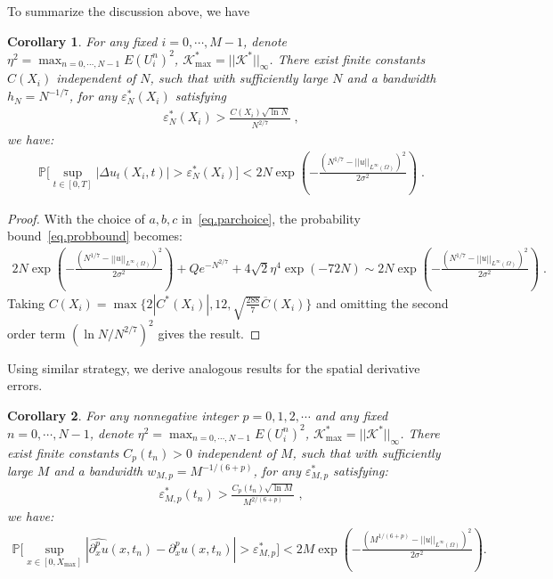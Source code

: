 \documentclass[a4paper,11pt]{article}
\newtheorem{corollary}{Corollary}[section]
\theoremstyle{definition}
\begin{document}
To summarize the discussion above, we have
\begin{corollary}
For any fixed $i=0,\cdots,M-1$, denote $\eta^2 = \max_{n=0,\cdots,N-1}E(U_i^n)^2$, $\mathcal{K}^*_{\max}=||\mathcal{K}^*||_\infty$. There exist finite constants $C(X_i)$ independent of $N$, such that with sufficiently large $N$ and a bandwidth $h_N = N^{-1/7}$, for any $\varepsilon_N^*(X_i)$ satisfying
\begin{align*}
\varepsilon_N^*(X_i)> \frac{C(X_i)\sqrt{\ln N}}{N^{2/7}}\;,
\end{align*}
we have:
\begin{align}
\mathbb{P}\Big[\sup_{t\in[0,T]}|\Delta u_t(X_i,t)|>\varepsilon_N^*(X_i)\Big]<2N \exp(-\frac{(N^{1/7}-||u||_{L^\infty(\Omega)})^2}{2\sigma^2})\;.\label{eq.SimpleboundDut}
\end{align}
\end{corollary}
\begin{proof}
With the choice of $a,b,c$ in~\eqref{eq.parchoice}, the probability bound~\eqref{eq.probbound} becomes:
\begin{align*}
2N \exp(-\frac{(N^{1/7}-||u||_{L^\infty(\Omega)})^2}{2\sigma^2})+Qe^{-N^{2/7}}+4\sqrt{2}\eta^4\exp(-72N)\sim 2N \exp(-\frac{(N^{1/7}-||u||_{L^\infty(\Omega)})^2}{2\sigma^2})\;.
\end{align*}
Taking $C(X_i) = \max\{2|C^*(X_i)|,12,\sqrt{\frac{288}{7}}\overline{C}(X_i)\}$	and omitting the second order term $(\ln N/N^{2/7})^2$ gives the result.
\end{proof}
Using similar strategy, we derive analogous results for the spatial derivative errors.
\begin{corollary}\label{cor.singlespace}
For any nonnegative integer $p=0,1,2,\cdots$ and any fixed $n=0,\cdots,N-1$, denote $\eta^2 = \max_{n=0,\cdots,N-1}E(U_i^n)^2$, $\mathcal{K}^*_{\max}=||\mathcal{K}^*||_\infty$. There exist finite constants $C_{p}(t_n)>0$ independent of $M$, such that with sufficiently large $M$ and a bandwidth $w_{M,p} = M^{-1/(6+p)}$, for any $\varepsilon_{M,p}^*$ satisfying:
\begin{align*}
\varepsilon_{M,p}^*(t_n)> \frac{C_{p}(t_n)\sqrt{\ln M}}{M^{2/(6+p)}}\;,
\end{align*}
we have:
\begin{align*}
\mathbb{P}\Big[\sup_{x\in[0,X_{\max}]}|\widehat{\partial_x^pu}(x,t_n)-\partial_x^pu(x,t_n)|>\varepsilon_{M,p}^*\Big]<2M \exp(-\frac{(M^{1/(6+p)}-||u||_{L^\infty(\Omega)})^2}{2\sigma^2}).
\end{align*}	
\end{corollary}
\end{document}
